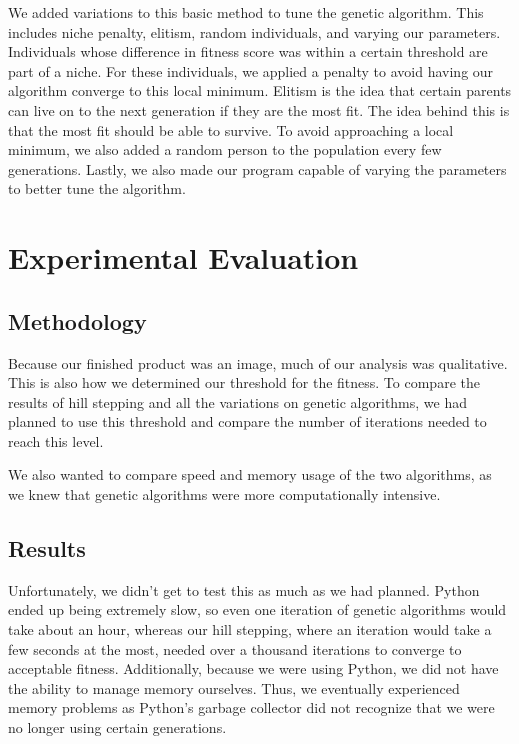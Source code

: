 \documentclass[12pt,letterpaper]{article}
\begin{document}
We added variations to this basic method to tune the genetic algorithm. This includes niche penalty, elitism, random individuals, and varying our parameters. Individuals whose difference in fitness score was within a certain threshold are part of a niche.  For these individuals, we applied a penalty to avoid having our algorithm converge to this local minimum.  Elitism is the idea that certain parents can live on to the next generation if they are the most fit.  The idea behind this is that the most fit should be able to survive.  To avoid approaching a local minimum, we also added a random person to the population every few generations.  Lastly, we also made our program capable of varying the parameters to better tune the algorithm.

\section{Experimental Evaluation}

\subsection{Methodology}
Because our finished product was an image, much of our analysis was qualitative. This is also how we determined our threshold for the fitness. To compare the results of hill stepping and all the variations on genetic algorithms, we had planned to use this threshold and compare the number of iterations needed to reach this level.  

We also wanted to compare speed and memory usage of the two algorithms, as we knew that genetic algorithms were more computationally intensive.

\subsection{Results}
Unfortunately, we didn't get to test this as much as we had planned. Python ended up being extremely slow, so even one iteration of genetic algorithms would take about an hour, whereas our hill stepping, where an iteration would take a few seconds at the most, needed over a thousand iterations to converge to acceptable fitness.  Additionally, because we were using Python, we did not have the ability to manage memory ourselves.  Thus, we eventually experienced memory problems as Python's garbage collector did not recognize that we were no longer using certain generations.
\end{document}
